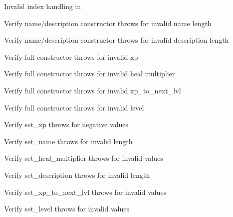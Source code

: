 \begin{DoxyRefList}
\label{test__test000060}%
%
Invalid index handling in   



\label{test__test000070}%
%
Verify name/description constructor throws for invalid name length  



\label{test__test000071}%
%
Verify name/description constructor throws for invalid description length  



\label{test__test000073}%
%
Verify full constructor throws for invalid xp  



\label{test__test000074}%
%
Verify full constructor throws for invalid heal multiplier  



\label{test__test000075}%
%
Verify full constructor throws for invalid xp\+\_\+to\+\_\+next\+\_\+lvl  



\label{test__test000076}%
%
Verify full constructor throws for invalid level  



\label{test__test000078}%
%
Verify set\+\_\+xp throws for negative values  



\label{test__test000080}%
%
Verify set\+\_\+name throws for invalid length  



\label{test__test000082}%
%
Verify set\+\_\+heal\+\_\+multiplier throws for invalid values  



\label{test__test000084}%
%
Verify set\+\_\+description throws for invalid length  



\label{test__test000086}%
%
Verify set\+\_\+xp\+\_\+to\+\_\+next\+\_\+lvl throws for invalid values  



\label{test__test000088}%
%
Verify set\+\_\+level throws for invalid values  




\end{DoxyRefList}
